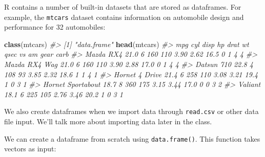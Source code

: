 \documentclass[]{book}
\newenvironment{Shaded}{\begin{snugshade}}{\end{snugshade}}
\newcommand{\KeywordTok}[1]{\textcolor[rgb]{0.13,0.29,0.53}{\textbf{#1}}}
\newcommand{\CommentTok}[1]{\textcolor[rgb]{0.56,0.35,0.01}{\textit{#1}}}
\newcommand{\NormalTok}[1]{#1}
\begin{document}
R contains a number of built-in datasets that are stored as dataframes.
For example, the \texttt{mtcars} dataset contains information on
automobile design and performance for 32 automobiles:

\begin{Shaded}
\begin{Highlighting}[]
\KeywordTok{class}\NormalTok{(mtcars)}
\CommentTok{#> [1] "data.frame"}
\KeywordTok{head}\NormalTok{(mtcars)}
\CommentTok{#>                    mpg cyl disp  hp drat   wt qsec vs am gear carb}
\CommentTok{#> Mazda RX4         21.0   6  160 110 3.90 2.62 16.5  0  1    4    4}
\CommentTok{#> Mazda RX4 Wag     21.0   6  160 110 3.90 2.88 17.0  0  1    4    4}
\CommentTok{#> Datsun 710        22.8   4  108  93 3.85 2.32 18.6  1  1    4    1}
\CommentTok{#> Hornet 4 Drive    21.4   6  258 110 3.08 3.21 19.4  1  0    3    1}
\CommentTok{#> Hornet Sportabout 18.7   8  360 175 3.15 3.44 17.0  0  0    3    2}
\CommentTok{#> Valiant           18.1   6  225 105 2.76 3.46 20.2  1  0    3    1}
\end{Highlighting}
\end{Shaded}

We also create dataframes when we import data through \texttt{read.csv}
or other data file input. We'll talk more about importing data later in
the class.

We can create a dataframe from scratch using \texttt{data.frame()}. This
function takes vectors as input:
\end{document}
